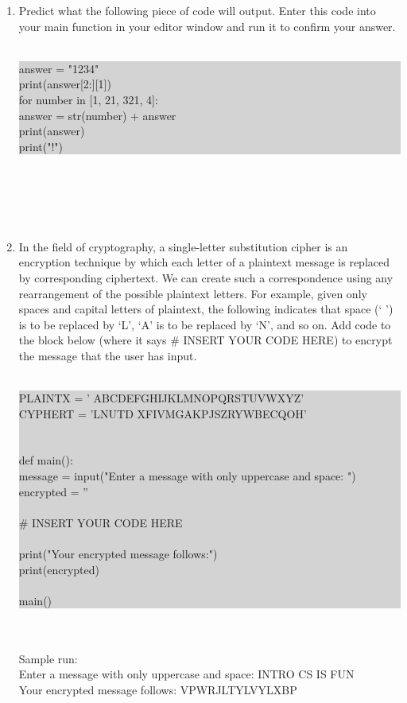 \documentclass[11pt, letterpaper, onecolumn, oneside, final]{article}
\begin{document}
\begin{enumerate}
\item Predict what the following piece of code will output. Enter this code into your {\consolas main} function in your editor window and run it to confirm your answer. 
\\
\\
\colorbox{lightgray}{\parbox{.99\textwidth}{\consolas answer = "1234"\\
print(answer[2:][1])\\
for number in [1, 21, 321, 4]:\\
\hspace*{6mm}answer = str(number) + answer\\
\hspace*{6mm}print(answer)\\
print("!")}}\\
\\
\\
\\
\newpage
\item  In the field of cryptography, a single-letter substitution cipher is an encryption technique by which
each letter of a plaintext message is replaced by corresponding ciphertext. We can create such a correspondence using any rearrangement of the possible plaintext letters. For example, given only spaces
and capital letters of plaintext, the following indicates that space (` ') is to be replaced by `L', `A'
is to be replaced by `N', and so on. Add code to the block below (where it says {\consolas \# INSERT YOUR CODE HERE}) to encrypt the {\consolas message} that the user has input.\\\\
 \colorbox{lightgray}{\parbox{.99\textwidth}{\consolas
 PLAINTX = ' ABCDEFGHIJKLMNOPQRSTUVWXYZ'\\
 CYPHERT = 'LNUTD XFIVMGAKPJSZRYWBECQOH'\\\\\\
 def main():\\
 \hspace*{9mm}message = input("Enter a message with only uppercase and space: ")
 \hspace*{9mm}encrypted = ''\\\\
 \hspace*{9mm}\# INSERT YOUR CODE HERE\\\\
 \hspace*{9mm}print("Your encrypted message follows:")\\
 \hspace*{9mm}print(encrypted)\\\\
 main()
 }}\\\\
Sample run:\\
{\consolas Enter a message with only uppercase and space: INTRO CS IS FUN\\
Your encrypted message follows: VPWRJLTYLVYLXBP\\}\\\\\\


\end{enumerate}
\end{document}
